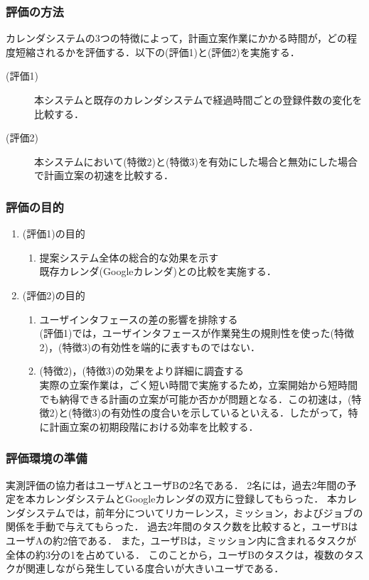 \documentclass[fleqn, 14pt]{extarticlej}
\begin{document}
\subsubsection{評価の方法}
カレンダシステムの3つの特徴によって，計画立案作業にかかる時間が，どの程度短縮されるかを評価する．以下の(評価1)と(評価2)を実施する．
	\begin{description}
		\item[(評価1)]本システムと既存のカレンダシステムで経過時間ごとの登録件数の変化を比較する．
		\item[(評価2)]本システムにおいて(特徴2)と(特徴3)を有効にした場合と無効にした場合で計画立案の初速を比較する．
	\end{description}
	
\subsubsection{評価の目的}
	\begin{enumerate}
		\item (評価1)の目的
		\begin{enumerate}
			\item 提案システム全体の総合的な効果を示す\\
				既存カレンダ(Googleカレンダ)との比較を実施する．
		\end{enumerate}
		\item (評価2)の目的
		\begin{enumerate}
			\item ユーザインタフェースの差の影響を排除する\\
				(評価1)では，ユーザインタフェースが作業発生の規則性を使った(特徴2)，(特徴3)の有効性を端的に表すものではない．
			\item (特徴2)，(特徴3)の効果をより詳細に調査する\\
	実際の立案作業は，ごく短い時間で実施するため，立案開始から短時間でも納得できる計画の立案が可能か否かが問題となる．この初速は，(特徴2)と(特徴3)の有効性の度合いを示しているといえる．したがって，特に計画立案の初期段階における効率を比較する．
		\end{enumerate}
	\end{enumerate}

\subsubsection{評価環境の準備}
実測評価の協力者はユーザAとユーザBの2名である．
2名には，過去2年間の予定を本カレンダシステムとGoogleカレンダの双方に登録してもらった．
本カレンダシステムでは，前年分についてリカーレンス，ミッション，およびジョブの関係を手動で与えてもらった．
過去2年間のタスク数を比較すると，ユーザBはユーザAの約2倍である．
また，ユーザBは，ミッション内に含まれるタスクが全体の約3分の1を占めている．
このことから，ユーザBのタスクは，複数のタスクが関連しながら発生している度合いが大きいユーザである．
\end{document}
